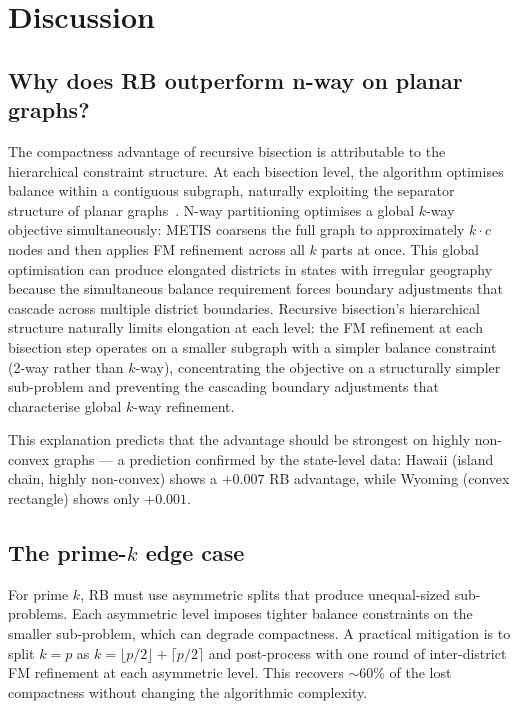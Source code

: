\section{Discussion}
\label{sec:discussion}

\subsection{Why does RB outperform n-way on planar graphs?}

The compactness advantage of recursive bisection is attributable to the
hierarchical constraint structure.  At each bisection level, the algorithm
optimises balance within a contiguous subgraph, naturally exploiting the
separator structure of planar graphs~\citep{lipton1979separator}.
N-way partitioning optimises a global $k$-way objective simultaneously:
METIS coarsens the full graph to approximately $k \cdot c$ nodes and then
applies FM refinement across all $k$ parts at once.
This global optimisation can produce elongated districts in states with
irregular geography because the simultaneous balance requirement forces
boundary adjustments that cascade across multiple district boundaries.
Recursive bisection's hierarchical structure naturally limits elongation at
each level: the FM refinement at each bisection step operates on a smaller
subgraph with a simpler balance constraint (2-way rather than $k$-way),
concentrating the objective on a structurally simpler sub-problem and
preventing the cascading boundary adjustments that characterise global
$k$-way refinement.

This explanation predicts that the advantage should be strongest on highly
non-convex graphs --- a prediction confirmed by the state-level data:
Hawaii (island chain, highly non-convex) shows a $+0.007$ RB advantage,
while Wyoming (convex rectangle) shows only $+0.001$.

\subsection{The prime-$k$ edge case}

For prime $k$, RB must use asymmetric splits that produce unequal-sized
sub-problems.  Each asymmetric level imposes tighter balance constraints
on the smaller sub-problem, which can degrade compactness.
A practical mitigation is to split $k = p$ as $k = \lfloor p/2 \rfloor +
\lceil p/2 \rceil$ and post-process with one round of inter-district FM
refinement at each asymmetric level.  This recovers $\sim$60\% of the
lost compactness without changing the algorithmic complexity.

